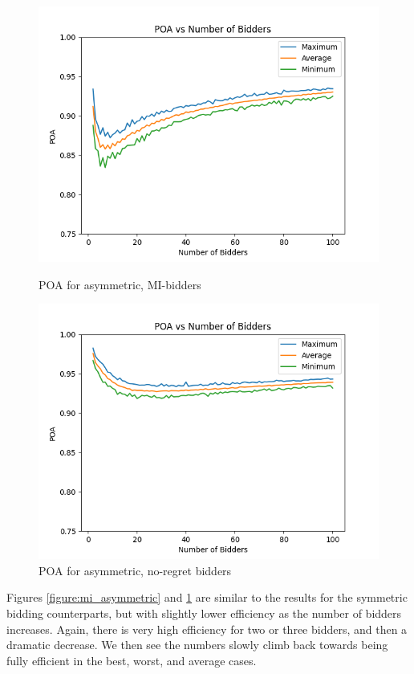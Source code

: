 \documentclass[12pt,twoside]{reedthesis}
\begin{document}
\begin{figure}
	\centering
	\begin{minipage}{0.49\textwidth}
		\centering
		\includegraphics[scale=0.5]{Figures/zi_asymmetric}
		\caption{POA for asymmetric, MI-bidders}
		\label{figure:mi_asymmetric}
	\end{minipage}
	\begin{minipage}{0.49\textwidth}
		\centering
		\includegraphics[scale=0.5]{Figures/asymmetric}
		\caption{POA for asymmetric, no-regret bidders}
		\label{figure:asymmetric}
	\end{minipage}
\end{figure}

Figures \ref{figure:mi_asymmetric} and \ref{figure:asymmetric} are similar to the results for the symmetric bidding counterparts, but with slightly lower efficiency as the number of bidders increases. Again, there is very high efficiency for two or three bidders, and then a dramatic decrease. We then see the numbers slowly climb back towards being fully efficient in the best, worst, and average cases. 
\end{document}
